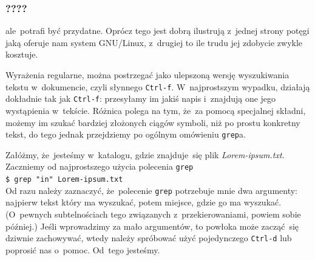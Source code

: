 \documentclass[10pt,t]{beamer}
\begin{document}
\begin{frame}
  \frametitle{????}



  ale~potrafi być przydatne. Oprócz tego jest dobrą ilustrują z~jednej
  strony potęgi jaką oferuje nam system GNU/Linux, z~drugiej to ile
  trudu jej zdobycie zwykle kosztuje.

  Wyrażenia regularne, można postrzegać jako ulepszoną wersję wyszukiwania
  tekstu w~dokumencie, czyli słynnego \texttt{Ctrl-f}. W~najprostszym
  wypadku, działają dokładnie tak jak \texttt{Ctrl-f}: przesyłamy im
  jakiś napis i~znajdują one jego wystąpienia w~tekście. Różnica polega na
  tym, że~za pomocą specjalnej składni, możemy im szukać bardziej złożonych
  ciągów symboli, niż po prostu konkretny tekst, do tego jednak przejdziemy
  po ogólnym omówieniu \texttt{grep}a.

  Załóżmy, że~jesteśmy w~katalogu, gdzie znajduje~się plik
  \textit{Lorem-ipsum.txt}. Zaczniemy od najprostszego użycia polecenia
  \texttt{grep} \\
  \texttt{\$ grep "in"{} Lorem-ipsum.txt} \\
  Od razu należy zaznaczyć, że~polecenie \texttt{grep} potrzebuje mnie dwa
  argumenty: najpierw tekst który ma wyszukać, potem miejsce, gdzie go ma
  wyszukać. (O~pewnych subtelnościach tego związanych z~przekierowaniami,
  powiem sobie później.) Jeśli wprowadzimy za mało argumentów, to powłoka
  może zacząć~się dziwnie zachowywać, wtedy należy spróbować użyć
  pojedynczego \texttt{Ctrl-d} lub poprosić nas o~pomoc. Od~tego jesteśmy.

\end{frame}





\begin{frame}
  \frametitle{}



\end{frame}
\end{document}
